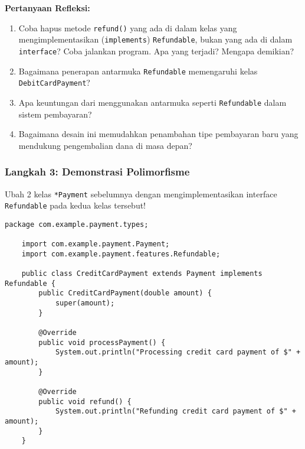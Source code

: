 \textbf{Pertanyaan Refleksi:}
\begin{enumerate}
	\item Coba hapus metode \texttt{refund()} yang ada di dalam kelas yang mengimplementasikan (\texttt{implements}) \texttt{Refundable}, bukan yang ada di dalam \texttt{interface}? Coba jalankan program. Apa yang terjadi? Mengapa demikian?
	\begin{tcolorbox}[colback=white, colframe=black,  width=\linewidth, height=3cm,  boxrule=1pt, sharp corners]
	\end{tcolorbox}
	\item Bagaimana penerapan antarmuka \texttt{Refundable} memengaruhi kelas \texttt{DebitCardPayment}?
	\begin{tcolorbox}[colback=white, colframe=black,  width=\linewidth, height=3cm,  boxrule=1pt, sharp corners]
	\end{tcolorbox}
	\item Apa keuntungan dari menggunakan antarmuka seperti \texttt{Refundable} dalam sistem pembayaran?
	\begin{tcolorbox}[colback=white, colframe=black,  width=\linewidth, height=3cm,  boxrule=1pt, sharp corners]
	\end{tcolorbox}
	\item Bagaimana desain ini memudahkan penambahan tipe pembayaran baru yang mendukung pengembalian dana di masa depan?
	\begin{tcolorbox}[colback=white, colframe=black,  width=\linewidth, height=3cm,  boxrule=1pt, sharp corners]
	\end{tcolorbox}
\end{enumerate}

\subsubsection{Langkah 3: Demonstrasi Polimorfisme}

Ubah 2 kelas \texttt{*Payment} sebelumnya dengan mengimplementasikan interface \texttt{Refundable} pada kedua kelas tersebut! 

\begin{lstlisting}[style=JavaStyle, caption={CreditCardPayment.java}]
	package com.example.payment.types;
	
	import com.example.payment.Payment;
	import com.example.payment.features.Refundable;
	
	public class CreditCardPayment extends Payment implements Refundable {
		public CreditCardPayment(double amount) {
			super(amount);
		}
		
		@Override
		public void processPayment() {
			System.out.println("Processing credit card payment of $" + amount);
		}
		
		@Override
		public void refund() {
			System.out.println("Refunding credit card payment of $" + amount);
		}
	}
\end{lstlisting}

